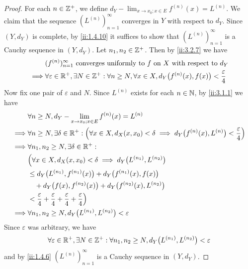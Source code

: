 \begin{proof}
  For each \(n \in \mathbb{Z}^+\), we define \(d_Y - \lim_{x \to x_0 ; x \in E} f^{(n)}(x) = L^{(n)}\).
  We claim that the sequence \((L^{(n)})_{n = 1}^\infty\) converges in \(Y\) with respect to \(d_Y\).
  Since \((Y, d_Y)\) is complete, by \cref{ii:1.4.10} it suffices to show that \((L^{(n)})_{n = 1}^\infty\) is a Cauchy sequence in \((Y, d_Y)\).
  Let \(n_1, n_2 \in \mathbb{Z}^+\).
  Then by \cref{ii:3.2.7} we have
  \begin{align*}
             & (f^{(n)})_{n = 1}^\infty \text{ converges uniformly to } f \text{ on } X \text{ with respect to } d_Y                                        \\
    \implies & \forall \varepsilon \in \mathbb{R}^+, \exists N \in \mathbb{Z}^+ : \forall n \geq N, \forall x \in X, d_Y\big(f^{(n)}(x), f(x)\big) < \dfrac{\varepsilon}{4}
  \end{align*}
  Now fix one pair of \(\varepsilon\) and \(N\).
  Since \(L^{(n)}\) exists for each \(n \in \mathbb{N}\), by \cref{ii:3.1.1} we have
  \begin{align*}
             & \forall n \geq N, d_Y - \lim_{x \to x_0 ; x \in E} f^{(n)}(x) = L^{(n)}                                                                                        \\
    \implies & \forall n \geq N, \exists \delta \in \mathbb{R}^+ : \Big(\forall x \in X, d_X(x, x_0) < \delta \implies d_Y\big(f^{(n)}(x), L^{(n)}\big) < \dfrac{\varepsilon}{4}\Big) \\
    \implies & \forall n_1, n_2 \geq N, \exists \delta \in \mathbb{R}^+ :                                                                                                             \\
             & \Big(\forall x \in X, d_X(x, x_0) < \delta \implies d_Y\big(L^{(n_1)}, L^{(n_2)}\big)                                                                          \\
             & \leq d_Y\big(L^{(n_1)}, f^{(n_1)}(x)\big) + d_Y\big(f^{(n_1)}(x), f(x)\big)                                                                                    \\
             & \quad + d_Y\big(f(x), f^{(n_2)}(x)\big) + d_Y\big(f^{(n_2)}(x), L^{(n_2)}\big)                                                                                 \\
             & < \dfrac{\varepsilon}{4} + \dfrac{\varepsilon}{4} + \dfrac{\varepsilon}{4} + \dfrac{\varepsilon}{4}\Big)                                                       \\
    \implies & \forall n_1, n_2 \geq N, d_Y\big(L^{(n_1)}, L^{(n_2)}\big) < \varepsilon
  \end{align*}
  Since \(\varepsilon\) was arbitrary, we have
  \[
    \forall \varepsilon \in \mathbb{R}^+, \exists N \in \mathbb{Z}^+ : \forall n_1, n_2 \geq N, d_Y\big(L^{(n_1)}, L^{(n_2)}\big) < \varepsilon
  \]
  and by \cref{ii:1.4.6} \((L^{(n)})_{n = 1}^\infty\) is a Cauchy sequence in \((Y, d_Y)\).


\end{proof}
